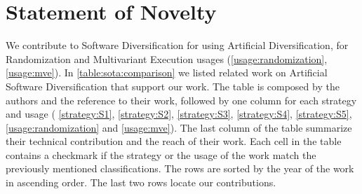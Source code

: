 




\section{Statement of Novelty}
\label{sota:novelty}

We contribute to Software Diversification for \wasm using Artificial Diversification, for Randomization and Multivariant Execution usages (\autoref{usage:randomization}, \autoref{usage:mve}). 
In \autoref{table:sota:comparison} we listed related work on Artificial Software Diversification that support our work. The table is composed by the authors and the reference to their work, followed by one column for each strategy and usage ( \autoref{strategy:S1},  \autoref{strategy:S2},  \autoref{strategy:S3},  \autoref{strategy:S4},  \autoref{strategy:S5}, \autoref{usage:randomization} and \autoref{usage:mve}). The last column of the table summarize their technical contribution and the reach of their work. Each cell in the table contains a checkmark if the strategy or the usage of the work match the previously mentioned classifications. The rows are sorted by the year of the work in ascending order. The last two rows locate our contributions. 




